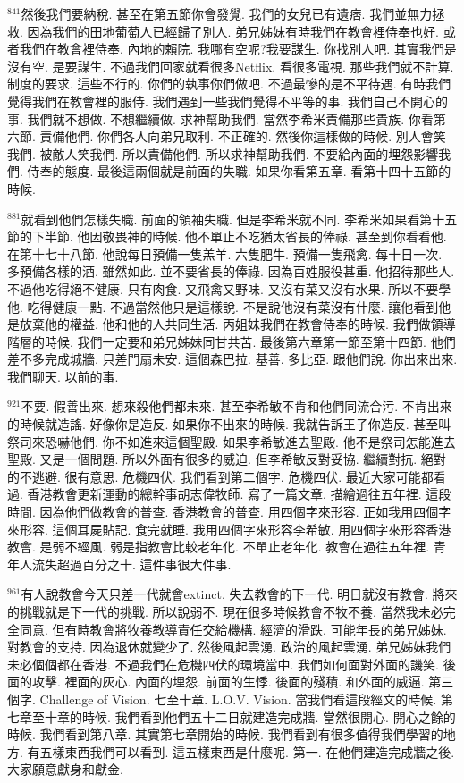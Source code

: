 \documentclass{book}
\begin{document}
$^{841}$然後我們要納稅.
甚至在第五節你會發覺.
我們的女兒已有遺痞.
我們並無力拯救.
因為我們的田地葡萄人已經歸了別人.
弟兄姊妹有時我們在教會裡侍奉也好.
或者我們在教會裡侍奉.
內地的賴院.
我哪有空呢?我要謀生.
你找別人吧.
其實我們是沒有空.
是要謀生.
不過我們回家就看很多Netflix.
看很多電視.
那些我們就不計算.
制度的要求.
這些不行的.
你們的執事你們做吧.
不過最慘的是不平待遇.
有時我們覺得我們在教會裡的服侍.
我們遇到一些我們覺得不平等的事.
我們自己不開心的事.
我們就不想做.
不想繼續做.
求神幫助我們.
當然李希米責備那些貴族.
你看第六節.
責備他們.
你們各人向弟兄取利.
不正確的.
然後你這樣做的時候.
別人會笑我們.
被敵人笑我們.
所以責備他們.
所以求神幫助我們.
不要給內面的埋怨影響我們.
侍奉的態度.
最後這兩個就是前面的失職.
如果你看第五章.
看第十四十五節的時候.

$^{881}$就看到他們怎樣失職.
前面的領袖失職.
但是李希米就不同.
李希米如果看第十五節的下半節.
他因敬畏神的時候.
他不單止不吃猶太省長的俸祿.
甚至到你看看他.
在第十七十八節.
他說每日預備一隻羔羊.
六隻肥牛.
預備一隻飛禽.
每十日一次.
多預備各樣的酒.
雖然如此.
並不要省長的俸祿.
因為百姓服役甚重.
他招待那些人.
不過他吃得絕不健康.
只有肉食.
又飛禽又野味.
又沒有菜又沒有水果.
所以不要學他.
吃得健康一點.
不過當然他只是這樣說.
不是說他沒有菜沒有什麼.
讓他看到他是放棄他的權益.
他和他的人共同生活.
丙姐妹我們在教會侍奉的時候.
我們做領導階層的時候.
我們一定要和弟兄姊妹同甘共苦.
最後第六章第一節至第十四節.
他們差不多完成城牆.
只差門扇未安.
這個森巴拉.
基善.
多比亞.
跟他們說.
你出來出來.
我們聊天.
以前的事.

$^{921}$不要.
假善出來.
想來殺他們都未來.
甚至李希敏不肯和他們同流合污.
不肯出來的時候就造謠.
好像你是造反.
如果你不出來的時候.
我就告訴王子你造反.
甚至叫祭司來恐嚇他們.
你不如進來這個聖殿.
如果李希敏進去聖殿.
他不是祭司怎能進去聖殿.
又是一個問題.
所以外面有很多的威迫.
但李希敏反對妥協.
繼續對抗.
絕對的不逃避.
很有意思.
危機四伏.
我們看到第二個字.
危機四伏.
最近大家可能都看過.
香港教會更新運動的總幹事胡志偉牧師.
寫了一篇文章.
描繪過往五年裡.
這段時間.
因為他們做教會的普查.
香港教會的普查.
用四個字來形容.
正如我用四個字來形容.
這個耳屍貼記.
食完就睡.
我用四個字來形容李希敏.
用四個字來形容香港教會.
是弱不經風.
弱是指教會比較老年化.
不單止老年化.
教會在過往五年裡.
青年人流失超過百分之十.
這件事很大件事.

$^{961}$有人說教會今天只差一代就會extinct.
失去教會的下一代.
明日就沒有教會.
將來的挑戰就是下一代的挑戰.
所以說弱不.
現在很多時候教會不牧不養.
當然我未必完全同意.
但有時教會將牧養教導責任交給機構.
經濟的滑跌.
可能年長的弟兄姊妹.
對教會的支持.
因為退休就變少了.
然後風起雲湧.
政治的風起雲湧.
弟兄姊妹我們未必個個都在香港.
不過我們在危機四伏的環境當中.
我們如何面對外面的譏笑.
後面的攻擊.
裡面的灰心.
內面的埋怨.
前面的生悸.
後面的殘積.
和外面的威逼.
第三個字.
Challenge of Vision.
七至十章.
L.O.V. Vision.
當我們看這段經文的時候.
第七章至十章的時候.
我們看到他們五十二日就建造完成牆.
當然很開心.
開心之餘的時候.
我們看到第八章.
其實第七章開始的時候.
我們看到有很多值得我們學習的地方.
有五樣東西我們可以看到.
這五樣東西是什麼呢.
第一.
在他們建造完成牆之後.
大家願意獻身和獻金.
\end{document}
